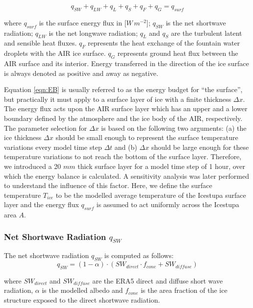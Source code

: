\documentclass[utf8]{frontiersSCNS} %
\begin{document}
\begin{equation} q_{SW} + q_{LW} + q_{L} + q_{S} + q_{F} + q_{G} = q_{surf} \label{eqn:EB} \end{equation}

where $q_{surf}$ is the surface energy flux in [$W\,m^{-2}$]; $q_{SW}$ is the net shortwave radiation; $q_{LW}$ is the
net longwave radiation; $q_{L}$ and $q_{S}$ are the turbulent latent and sensible heat fluxes. $q_{F}$ represents the heat
exchange of the fountain water droplets with the AIR ice surface. $q_{G}$ represents ground heat flux between the AIR
surface and its interior. Energy transferred in the direction of the ice surface is always denoted as positive and
away as negative.

Equation \ref{eqn:EB} is usually referred to as the energy budget for “the surface”, but practically it must apply to
a surface layer of ice with a finite thickness $\Delta x$. The energy flux acts upon the AIR surface layer which
has an upper and a lower boundary defined by the atmosphere and the ice body of the AIR, respectively. The
parameter selection for $\Delta x$ is based on the following two arguments: (a) the ice thickness $\Delta x$ should be
small enough to represent the surface temperature variations every model time step $\Delta t$ and (b) $\Delta x$ should
be large enough for these temperature variations to not reach the bottom of the surface layer.  Therefore, we introduced
a 20 $mm$ thick surface layer for a model time step of 1 hour, over which the energy balance is calculated. A
sensitivity analysis was later performed to understand the influence of this factor. Here, we define the surface
temperature $T_{ice}$ to be the modelled average temperature of the Icestupa surface layer and the energy flux $q_{surf}$
is assumed to act uniformly across the Icestupa area $A$.

\subsubsection{Net Shortwave Radiation \texorpdfstring{$q_{SW}$}{Lg}}
The net shortwave radiation $q_{SW}$ is computed as follows:
\begin{equation} q_{SW} = (1- \alpha)\cdot (SW_{direct} \cdot f_{cone} + SW_{diffuse}) \label{eqn:SW} \end{equation}

where $SW_{direct}$ and $SW_{diffuse}$ are the ERA5 direct and diffuse short wave radiation, $\alpha$ is the modelled
albedo and $f_{cone}$ is the area fraction of the ice structure exposed to the direct shortwave radiation.
\end{document}

